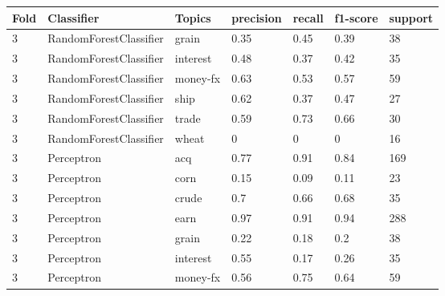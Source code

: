 \documentclass{article}
\begin{document}
\begin{table}[h]
\begin{tabular}{lllllll}
\textbf{Fold} & \textbf{Classifier}    & \textbf{Topics} & \textbf{precision} & \textbf{recall} & \textbf{f1-score} & \textbf{support} \\ \hline
3             & RandomForestClassifier & grain           & 0.35               & 0.45            & 0.39              & 38               \\
3             & RandomForestClassifier & interest        & 0.48               & 0.37            & 0.42              & 35               \\
3             & RandomForestClassifier & money-fx        & 0.63               & 0.53            & 0.57              & 59               \\
3             & RandomForestClassifier & ship            & 0.62               & 0.37            & 0.47              & 27               \\
3             & RandomForestClassifier & trade           & 0.59               & 0.73            & 0.66              & 30               \\
3             & RandomForestClassifier & wheat           & 0                  & 0               & 0                 & 16               \\
3             & Perceptron             & acq             & 0.77               & 0.91            & 0.84              & 169              \\
3             & Perceptron             & corn            & 0.15               & 0.09            & 0.11              & 23               \\
3             & Perceptron             & crude           & 0.7                & 0.66            & 0.68              & 35               \\
3             & Perceptron             & earn            & 0.97               & 0.91            & 0.94              & 288              \\
3             & Perceptron             & grain           & 0.22               & 0.18            & 0.2               & 38               \\
3             & Perceptron             & interest        & 0.55               & 0.17            & 0.26              & 35               \\
3             & Perceptron             & money-fx        & 0.56               & 0.75            & 0.64              & 59               \\

\end{tabular}
\end{table}
\end{document}

